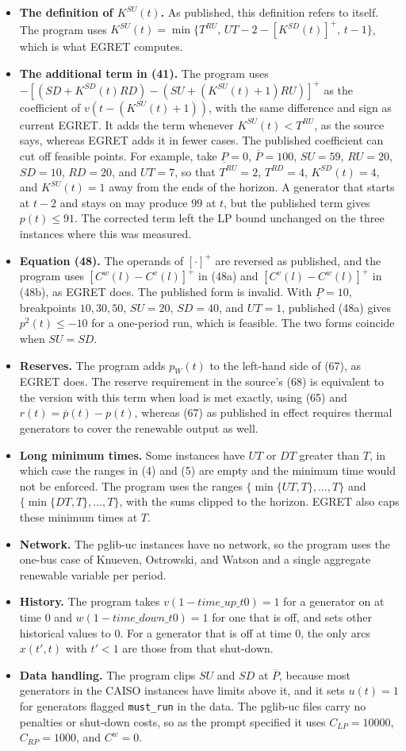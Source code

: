 \documentclass[11pt]{article}
\newcommand{\Pmax}{\overline{P}}
\newcommand{\Pmin}{\underline{P}}
\newcommand{\pbar}{\overline{p}}
\begin{document}
\begin{itemize}
\item \textbf{The definition of $K^{SU}(t)$.} As published, this definition refers to itself. The program uses $K^{SU}(t) = \min\{T^{RU},\, UT-2-[K^{SD}(t)]^+,\, t-1\}$, which is what EGRET computes.
\item \textbf{The additional term in (41).} The program uses $-[(SD+K^{SD}(t)RD) - (SU+(K^{SU}(t)+1)RU)]^+$ as the coefficient of $v(t-(K^{SU}(t)+1))$, with the same difference and sign as current EGRET. It adds the term whenever $K^{SU}(t) < T^{RU}$, as the source says, whereas EGRET adds it in fewer cases. The published coefficient can cut off feasible points. For example, take $\Pmin=0$, $\Pmax=100$, $SU=59$, $RU=20$, $SD=10$, $RD=20$, and $UT=7$, so that $T^{RU}=2$, $T^{RD}=4$, $K^{SD}(t)=4$, and $K^{SU}(t)=1$ away from the ends of the horizon. A generator that starts at $t-2$ and stays on may produce $99$ at $t$, but the published term gives $p(t) \le 91$. The corrected term left the LP bound unchanged on the three instances where this was measured.
\item \textbf{Equation (48).} The operands of $[\cdot]^+$ are reversed as published, and the program uses $[C^w(l)-C^v(l)]^+$ in (48a) and $[C^v(l)-C^w(l)]^+$ in (48b), as EGRET does. The published form is invalid. With $\Pmin=10$, breakpoints $10, 30, 50$, $SU=20$, $SD=40$, and $UT=1$, published (48a) gives $p^2(t) \le -10$ for a one-period run, which is feasible. The two forms coincide when $SU=SD$.
\item \textbf{Reserves.} The program adds $p_W(t)$ to the left-hand side of (67), as EGRET does. The reserve requirement in the source's (68) is equivalent to the version with this term when load is met exactly, using (65) and $r(t)=\pbar(t)-p(t)$, whereas (67) as published in effect requires thermal generators to cover the renewable output as well.
\item \textbf{Long minimum times.} Some instances have $UT$ or $DT$ greater than $T$, in which case the ranges in (4) and (5) are empty and the minimum time would not be enforced. The program uses the ranges $\{\min\{UT,T\},\dots,T\}$ and $\{\min\{DT,T\},\dots,T\}$, with the sums clipped to the horizon. EGRET also caps these minimum times at $T$.
\item \textbf{Network.} The pglib-uc instances have no network, so the program uses the one-bus case of Knueven, Ostrowski, and Watson and a single aggregate renewable variable per period.
\item \textbf{History.} The program takes $v(1-\mathit{time\_up\_t0})=1$ for a generator on at time $0$ and $w(1-\mathit{time\_down\_t0})=1$ for one that is off, and sets other historical values to $0$. For a generator that is off at time $0$, the only arcs $x(t',t)$ with $t'<1$ are those from that shut-down.
\item \textbf{Data handling.} The program clips $SU$ and $SD$ at $\Pmax$, because most generators in the CAISO instances have limits above it, and it sets $u(t)=1$ for generators flagged \texttt{must\_run} in the data. The pglib-uc files carry no penalties or shut-down costs, so as the prompt specified it uses $C_{LP}=10000$, $C_{RP}=1000$, and $C^w=0$.
\end{itemize}
\end{document}
